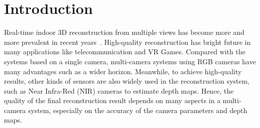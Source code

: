 
\section{Introduction}
Real-time indoor 3D reconstruction from multiple views has become more and more prevalent in recent years~\cite{dou2016fusion4d,orts2016holoportation}. High-quality reconstruction has bright future in many applications like telecommunication and VR Games. Compared with the systems based on a single camera, multi-camera systems using RGB cameras have many advantages such as a wider horizon. Meanwhile, to achieve high-quality results, other kinds of sensors are also widely used in the reconstruction system, such as Near Infra-Red (NIR) cameras to estimate depth maps. Hence, the quality of the final reconstruction result depends on many aspects in a multi-camera system, especially on the accuracy of the camera parameters and depth maps.

